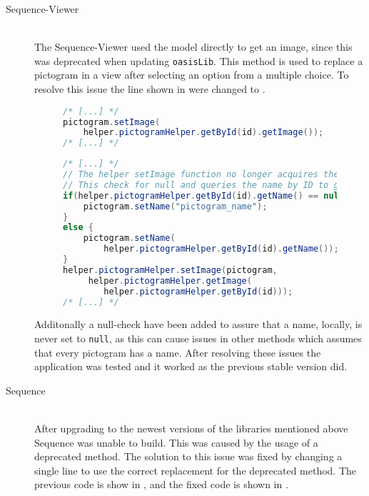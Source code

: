 \begin{description} 
    \item[Sequence-Viewer] \hfill \\ 
    The Sequence-Viewer used the model directly to get an image, since this was deprecated when updating \texttt{oasisLib}. 
    This method is used to replace a pictogram in a view after selecting an option from a multiple choice. 
     To resolve this issue the line shown in  were changed to . 
     \begin{figure} 
        \begin{lstlisting}[language=java, caption={Sequence-Viewer with deprecated method call. }, label=lst:dep-sv-prev] 
/* [...] */ 
pictogram.setImage( 
    helper.pictogramHelper.getById(id).getImage()); 
/* [...] */ 
        \end{lstlisting} 
    \end{figure} 
    \begin{figure} 
        \begin{lstlisting}[language=java, caption={Sequence-Viewer replacement code. }, label=lst:dep-sv-upd] 
/* [...] */ 
// The helper setImage function no longer acquires the pictogram name and causes null exception error 
// This check for null and queries the name by ID to get name 
if(helper.pictogramHelper.getById(id).getName() == null) { 
    pictogram.setName("pictogram_name"); 
} 
else { 
    pictogram.setName( 
        helper.pictogramHelper.getById(id).getName()); 
} 
helper.pictogramHelper.setImage(pictogram, 
     helper.pictogramHelper.getImage( 
        helper.pictogramHelper.getById(id))); 
/* [...] */ 
        \end{lstlisting} 
    \end{figure} 
    Additonally a null-check have been added to assure that a name, locally, is never set to \texttt{null}, as this can cause issues in other methods which assumes that every pictogram has a name. 
     After resolving these issues the application was tested and it worked as the previous stable version did. 
     \item[Sequence] \hfill \\ 
    After upgrading to the newest versions of the libraries mentioned above Sequence was unable to build. 
     This was caused by the usage of a deprecated method. 
     The solution to this issue was fixed by changing a single line to use the correct replacement for the deprecated method. 
    The previous code is show in , and the fixed code is shown in . 

\end{description}
